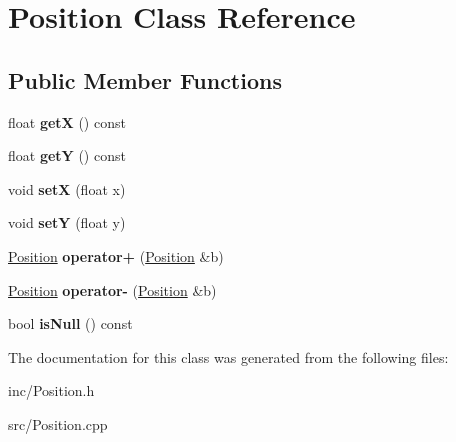 \hypertarget{class_position}{}\section{Position Class Reference}
\label{class_position}
\subsection*{Public Member Functions}
\begin{DoxyCompactItemize}
\item 
\mbox{\label{class_position_a252efaf275c7276a6f35338d198de7ee}} 
float {\bfseries getX} () const
\item 
\mbox{\label{class_position_a53ad8ec2f8383db4d615b3fc4e888f77}} 
float {\bfseries getY} () const
\item 
\mbox{\label{class_position_aa8724fe6c117c2134d0a8ad268e04c0e}} 
void {\bfseries setX} (float x)
\item 
\mbox{\label{class_position_accab4328a77d8a5f90d2d51db32eb97d}} 
void {\bfseries setY} (float y)
\item 
\mbox{\label{class_position_a03606676793991024f82dd56dca9e978}} 
\hyperlink{class_position}{Position} {\bfseries operator+} (\hyperlink{class_position}{Position} \&b)
\item 
\mbox{\label{class_position_a4a2823c706eaf5984e5825ac8c7fa13f}} 
\hyperlink{class_position}{Position} {\bfseries operator-\/} (\hyperlink{class_position}{Position} \&b)
\item 
\mbox{\label{class_position_a011d4d65d949c91cfdbb7163b18b159e}} 
bool {\bfseries is\+Null} () const
\end{DoxyCompactItemize}


The documentation for this class was generated from the following files\+:\begin{DoxyCompactItemize}
\item 
inc/Position.\+h\item 
src/Position.\+cpp\end{DoxyCompactItemize}
